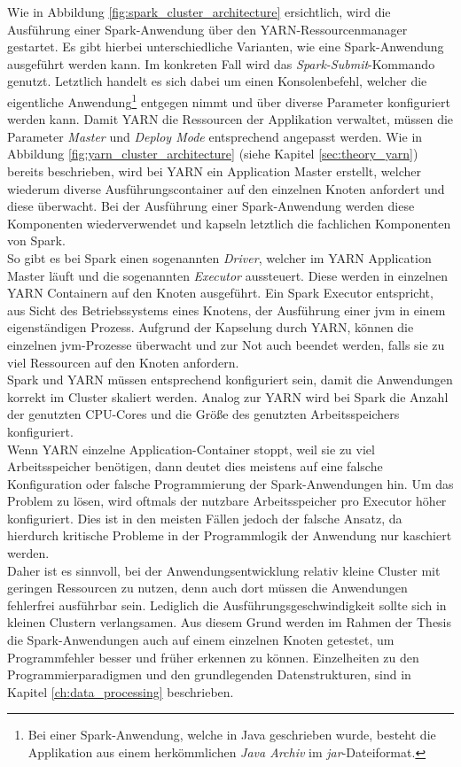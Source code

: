 \noindent
Wie in Abbildung \ref{fig:spark_cluster_architecture} ersichtlich, wird die Ausführung einer Spark-Anwendung über den YARN-Ressourcenmanager gestartet. Es gibt hierbei unterschiedliche Varianten, wie eine Spark-Anwendung ausgeführt werden kann. 
Im konkreten Fall wird das \textit{Spark-Submit}-Kommando genutzt. Letztlich handelt es sich dabei um einen Konsolenbefehl, welcher die eigentliche Anwendung\footnote{Bei einer Spark-Anwendung, welche in Java geschrieben wurde, besteht die Applikation aus einem herkömmlichen \textit{Java Archiv} im \textit{\gls{jar}}-Dateiformat.} entgegen nimmt und über diverse Parameter konfiguriert werden kann. 
Damit YARN die Ressourcen der Applikation verwaltet, müssen die Parameter \textit{Master} und \textit{Deploy Mode} entsprechend angepasst werden. Wie in Abbildung \ref{fig:yarn_cluster_architecture} (siehe Kapitel \ref{sec:theory_yarn}) bereits beschrieben, wird bei YARN ein Application Master erstellt, welcher wiederum diverse Ausführungscontainer auf den einzelnen Knoten anfordert und diese überwacht. Bei der Ausführung einer Spark-Anwendung werden diese Komponenten wiederverwendet und kapseln letztlich die fachlichen Komponenten von Spark.\\
So gibt es bei Spark einen sogenannten \textit{Driver}, welcher im YARN Application Master läuft und die sogenannten \textit{Executor} aussteuert. Diese werden in einzelnen YARN Containern auf den Knoten ausgeführt. Ein Spark Executor entspricht, aus Sicht des Betriebssystems eines Knotens, der Ausführung einer \gls{jvm} in einem eigenständigen Prozess. Aufgrund der Kapselung durch YARN, können die einzelnen \gls{jvm}-Prozesse überwacht und zur Not auch beendet werden, falls sie zu viel Ressourcen auf den Knoten anfordern.\\

\noindent
Spark und YARN müssen entsprechend konfiguriert sein, damit die Anwendungen korrekt im Cluster skaliert werden. Analog zur YARN wird bei Spark die Anzahl der genutzten CPU-Cores und die Größe des genutzten Arbeitsspeichers konfiguriert.\\
Wenn YARN einzelne Application-Container stoppt, weil sie zu viel Arbeitsspeicher benötigen, dann deutet dies meistens auf eine falsche Konfiguration oder falsche Programmierung der Spark-Anwendungen hin. Um das Problem zu lösen, wird oftmals der nutzbare Arbeitsspeicher pro Executor höher konfiguriert. Dies ist in den meisten Fällen jedoch der falsche Ansatz, da hierdurch kritische Probleme in der Programmlogik der Anwendung nur kaschiert werden.\\ 
Daher ist es sinnvoll, bei der Anwendungsentwicklung relativ kleine Cluster mit geringen Ressourcen zu nutzen, denn auch dort müssen die Anwendungen fehlerfrei ausführbar sein. Lediglich die Ausführungsgeschwindigkeit sollte sich in kleinen Clustern verlangsamen. Aus diesem Grund werden im Rahmen der Thesis die Spark-Anwendungen auch auf einem einzelnen Knoten getestet, um Programmfehler besser und früher erkennen zu können. Einzelheiten zu den Programmierparadigmen und den grundlegenden Datenstrukturen, sind in Kapitel \ref{ch:data_processing} beschrieben.


